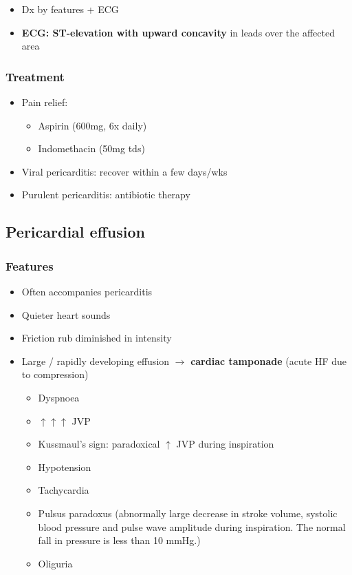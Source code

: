 \documentclass[
  12pt,
]{memoir}
\providecommand{\tightlist}{%
  \setlength{\itemsep}{0pt}\setlength{\parskip}{0pt}}
\begin{document}
\begin{itemize}
\tightlist
\item
  Dx by features + ECG
\item
  \textbf{ECG: ST-elevation with upward concavity} in leads over the
  affected area
\end{itemize}

\hypertarget{treatment-9}{%
\subsubsection{Treatment}\label{treatment-9}}

\begin{itemize}
\tightlist
\item
  Pain relief:

  \begin{itemize}
  \tightlist
  \item
    Aspirin (600mg, 6x daily)
  \item
    Indomethacin (50mg tds)
  \end{itemize}
\item
  Viral pericarditis: recover within a few days/wks
\item
  Purulent pericarditis: antibiotic therapy
\end{itemize}

\hypertarget{pericardial-effusion}{%
\subsection{Pericardial effusion}\label{pericardial-effusion}}

\hypertarget{features-17}{%
\subsubsection{Features}\label{features-17}}

\begin{itemize}
\tightlist
\item
  Often accompanies pericarditis
\item
  Quieter heart sounds
\item
  Friction rub diminished in intensity
\item
  Large / rapidly developing effusion \(\rightarrow\) \textbf{cardiac
  tamponade} (acute HF due to compression)

  \begin{itemize}
  \tightlist
  \item
    Dyspnoea
  \item
    \(\uparrow\uparrow\uparrow\) JVP
  \item
    Kussmaul's sign: paradoxical \(\uparrow\) JVP during inspiration
  \item
    Hypotension
  \item
    Tachycardia
  \item
    Pulsus paradoxus (abnormally large decrease in stroke volume,
    systolic blood pressure and pulse wave amplitude during inspiration.
    The normal fall in pressure is less than 10 mmHg.)
  \item
    Oliguria
  \end{itemize}
\end{itemize}
\end{document}
